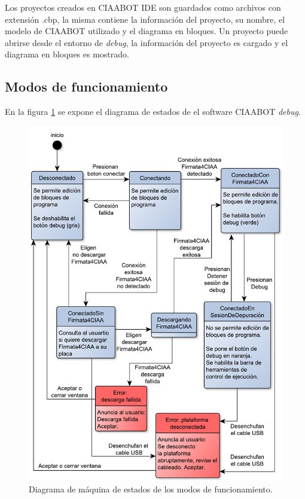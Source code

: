 Los proyectos creados en CIAABOT IDE son guardados como archivos con extensión .cbp, la misma contiene la información del proyecto, su nombre, el modelo de CIAABOT utilizado
y el diagrama en bloques. Un proyecto puede abrirse desde el entorno de \emph{debug}, la información del proyecto es cargado y el diagrama en bloques es mostrado.

\subsection{Modos de funcionamiento}
\label{subsec:Modos de funcionamiento}

En la figura \ref{fig:diagrama-estados} se expone el diagrama de estados de el software CIAABOT \emph{debug}.


\begin{figure}[!htbp]
	\begin{center}  %
		\includegraphics*[width=15cm]{./Figures/diagrama-estados.pdf}
		\par\caption{Diagrama de máquina de estados de los modos de funcionamiento.}\label{fig:diagrama-estados}
	\end{center}
\end{figure}


